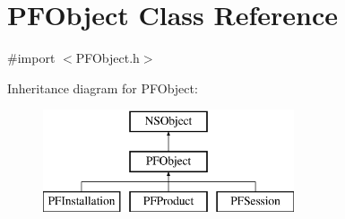 \hypertarget{interface_p_f_object}{}\section{P\+F\+Object Class Reference}
\label{interface_p_f_object}


{\ttfamily \#import $<$P\+F\+Object.\+h$>$}

Inheritance diagram for P\+F\+Object\+:\begin{figure}[H]
\begin{center}
\leavevmode
\includegraphics[height=3.000000cm]{interface_p_f_object}
\end{center}
\end{figure}
